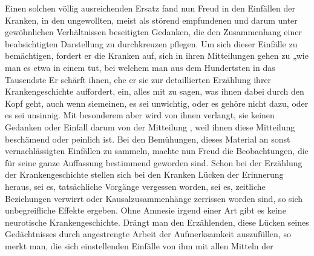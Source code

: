 \documentclass[twoside=true,titlepage=false,open=any, parskip=never, fontsize=10pt, headings=small, chapterprefix=false, appendixprefix=false]{scrbook}
\begin{document}
            
        \pstart
        Einen solchen völlig ausreichenden Ersatz fand nun Freud in den Einfällen der Kranken,  in den ungewollten, meist als störend empfundenen und darum unter
               gewöhnlichen Verhältnissen beseitigten Gedanken, die den Zusammenhang einer
               beabsichtigten Darstellung zu durchkreuzen pflegen. Um sich dieser Einfälle zu
               bemächtigen, fordert er die Kranken auf, sich in ihren Mitteilungen gehen zu „wie man es etwa in einem 
               tut, bei welchem man aus dem
               Hundertsten in das Tausendste  Er schärft ihnen, ehe er sie zur detaillierten Erzählung ihrer
               Krankengeschichte auffordert, ein, alles mit zu sagen, was ihnen dabei durch den
               Kopf geht, auch wenn siemeinen, es sei unwichtig, oder es gehöre nicht dazu, oder es sei
               unsinnig. Mit besonderem  aber wird von ihnen verlangt,  sie keinen Gedanken oder Einfall darum von der Mitteilung , weil ihnen diese Mitteilung beschämend oder peinlich ist. Bei den
               Bemühungen, dieses Material an sonst vernachlässigten Einfällen zu sammeln,
               machte nun Freud die Beobachtungen, die für
               seine ganze Auffassung bestimmend geworden sind. Schon bei der Erzählung der Krankengeschichte stellen
               sich bei den Kranken Lücken der Erinnerung heraus, sei es,  tatsächliche Vorgänge vergessen worden, sei es,  zeitliche Beziehungen verwirrt oder Kausalzusammenhänge zerrissen worden sind, so  sich unbegreifliche Effekte ergeben. Ohne Amnesie irgend einer Art gibt
               es keine neurotische Krankengeschichte. Drängt man den Erzählenden,
               diese Lücken seines Gedächtnisses durch angestrengte Arbeit der Aufmerksamkeit
                  auszufüllen, so merkt man,  die  sich einstellenden Einfälle von ihm mit allen Mitteln der
\end{document}
